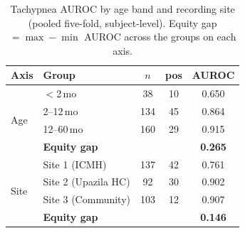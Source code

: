 \begin{table}[!t]
\caption{Tachypnea AUROC by age band and recording site (pooled five-fold, subject-level). Equity gap
$=\max-\min$ AUROC across the groups on each axis.}
\label{tab:equity}\centering\small
\begin{tabular}{@{}llccc@{}}\toprule
Axis & Group & $n$ & pos & AUROC\\\midrule
\multirow{4}{*}{Age}
 & $<$2\,mo            & 38  & 10 & 0.650 \\
 & 2--12\,mo           & 134 & 45 & 0.864 \\
 & 12--60\,mo          & 160 & 29 & 0.915 \\
 \cmidrule(l){2-5}
 & \textbf{Equity gap} &     &    & \textbf{0.265} \\\midrule
\multirow{4}{*}{Site}
 & Site 1 (ICMH)       & 137 & 42 & 0.761 \\
 & Site 2 (Upazila HC) & 92  & 30 & 0.902 \\
 & Site 3 (Community)  & 103 & 12 & 0.907 \\
 \cmidrule(l){2-5}
 & \textbf{Equity gap} &     &    & \textbf{0.146} \\\bottomrule
\end{tabular}
\end{table}
